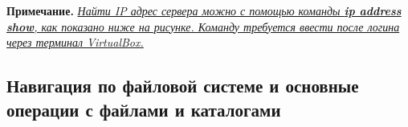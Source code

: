 \documentclass[14pt, a4paper]{article}
\begin{document}
\textbf{Примечание.} \textit{\uline{Найти IP адрес сервера можно с помощью команды \textbf{ip address show}, как показано
ниже на рисунке. Команду требуется ввести после логина через терминал VirtualBox.}}

\begin{figure}[H]%
    \centering
    \label{1.0}
\end{figure}


\subsection*{Навигация по файловой системе и основные операции с
файлами и каталогами}
\end{document}
